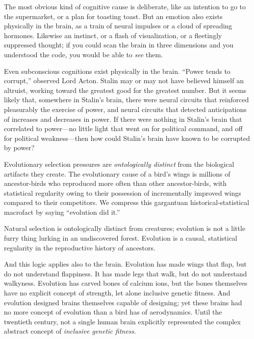 {
 The most obvious kind of cognitive cause is deliberate, like an
intention to go to the supermarket, or a plan for toasting toast. But
an emotion also exists physically in the brain, as a train of neural
impulses or a cloud of spreading hormones. Likewise an instinct, or a
flash of visualization, or a fleetingly suppressed thought; if you
could scan the brain in three dimensions and you understood the code,
you would be able to \textit{see} them.}

{
 Even subconscious cognitions exist physically in the brain.
``Power tends to corrupt,'' observed
Lord Acton. Stalin may or may not have believed himself an altruist,
working toward the greatest good for the greatest number. But it seems
likely that, somewhere in Stalin's brain, there were
neural circuits that reinforced pleasurably the exercise of power, and
neural circuits that detected anticipations of increases and decreases
in power. If there were nothing in Stalin's brain that
correlated to power---no little light that went on for political
command, and off for political weakness---then how could
Stalin's brain have known to be corrupted by power?}

{
 Evolutionary selection pressures are \textit{ontologically
distinct} from the biological artifacts they create. The evolutionary
cause of a bird's wings is millions of ancestor-birds
who reproduced more often than other ancestor-birds, with statistical
regularity owing to their possession of incrementally improved wings
compared to their competitors. We compress this gargantuan
historical-statistical macrofact by saying ``evolution
did it.''}

{
 Natural selection is ontologically distinct from creatures;
evolution is not a little furry thing lurking in an undiscovered
forest. Evolution is a causal, statistical regularity in the
reproductive history of ancestors.}

{
 And this logic applies also to the brain. Evolution has made wings
that flap, but do not understand flappiness. It has made legs that
walk, but do not understand walkyness. Evolution has carved bones of
calcium ions, but the bones themselves have no explicit concept of
strength, let alone inclusive genetic fitness. And evolution designed
brains themselves capable of designing; yet these brains had no more
concept of evolution than a bird has of aerodynamics. Until the
twentieth century, not a single human brain explicitly represented the
complex abstract concept of \textit{inclusive genetic fitness}.}

